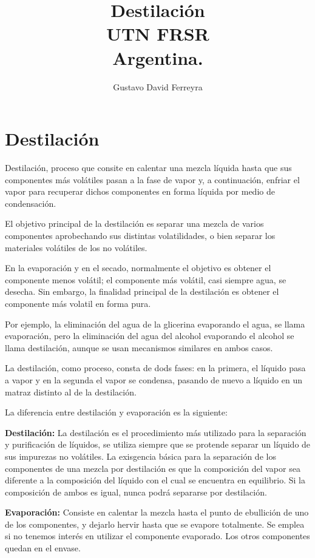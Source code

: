 \documentclass[11pt,openany]{book}
\title{Destilación \\ UTN FRSR \\ Argentina.}
\author{Gustavo David Ferreyra}
\begin{document}
\maketitle
\chapter{Destilación}

Destilación, proceso que consite en calentar una mezcla líquida hasta que sus componentes más 
volátiles pasan a la fase de vapor y, a continuación, enfriar el vapor para recuperar dichos 
componentes en forma líquida por medio de condensación.

El objetivo principal de la destilación es separar una mezcla de varios componentes aprobechando 
sus distintas volatilidades, o bien separar los materiales volátiles de los no volátiles.

En la evaporación y en el secado, normalmente el objetivo es obtener el componente menos volátil;
el componente más volátil, casi siempre agua, se desecha. Sin embargo, la finalidad principal 
de la destilación es obtener el componente más volatil en forma pura.

Por ejemplo, la eliminación del agua de la glicerina evaporando el agua, se llama evaporación, pero 
la eliminación del agua del alcohol evaporando el alcohol se llama destilación, aunque se usan 
mecanismos similares en ambos casos.

La destilación, como proceso, consta de dods fases: en la primera, el líquido pasa a vapor y en la 
segunda el vapor se condensa, pasando de nuevo a líquido en un matraz distinto al de la destilación.

La diferencia entre destilación y evaporación es la siguiente:

\textbf{Destilación:} La destilación es el procedimiento más utilizado para la separación y purificación de 
líquidos, se utiliza siempre  que se protende separar un líquido de sus impurezas no volátiles.
La exisgencia básica para la separación de los componentes de una mezcla por destilación es que la 
composición del vapor sea diferente a la composición del líquido con el cual se encuentra en equilibrio. Si 
la composición de ambos es igual, nunca podrá separarse por destilación.

\textbf{Evaporación:} Consiste en calentar la mezcla hasta el punto de ebullición de uno de los 
componentes, y dejarlo hervir hasta que se evapore totalmente. Se emplea si no tenemos interés 
en utilizar el componente evaporado. Los otros componentes quedan en el envase.
\end{document}
